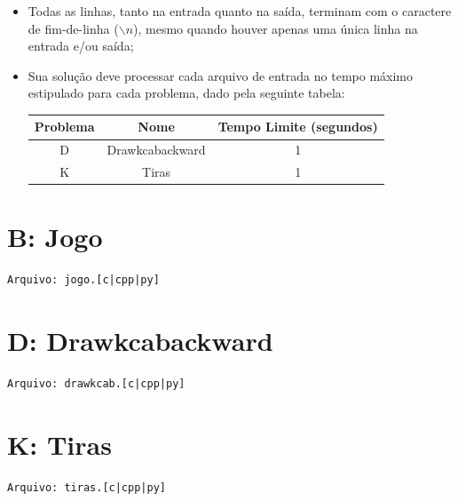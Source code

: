 \documentclass[12pt,oneside]{article} %
\begin{document}
\begin{itemize}
    \item Todas as linhas, tanto na entrada quanto na saída, terminam com o
    caractere de fim-de-linha ($\backslash n$), mesmo quando houver apenas uma única
    linha na entrada e/ou saída;

    \item Sua solução deve processar cada arquivo de entrada no tempo máximo
    estipulado para cada problema, dado pela seguinte tabela:

    \begin{table}[h]
    \centering
    \begin{tabular}{|c|c||c|}
    \hline
    \textbf{Problema} & \textbf{Nome} & \textbf{Tempo Limite (segundos)} \\
    \hline
    D & Drawkcabackward & 1 \\
    \hline
    K & Tiras & 1 \\
    \hline
    \end{tabular}
    \end{table}

\end{itemize}

\newpage
\section*{B: Jogo } %
\vspace{-0.52cm}
\noindent \begin{verbatim}Arquivo: jogo.[c|cpp|py]\end{verbatim}


\newpage
\section*{D: Drawkcabackward} %
\vspace{-0.52cm}
\noindent \begin{verbatim}Arquivo: drawkcab.[c|cpp|py]\end{verbatim}


\newpage
\section*{K: Tiras } %
\vspace{-0.52cm}
\noindent \begin{verbatim}Arquivo: tiras.[c|cpp|py]\end{verbatim}

\end{document}
